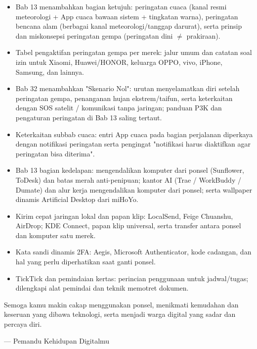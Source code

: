 \begin{itemize}
  \item Bab 13 menambahkan bagian ketujuh: peringatan cuaca (kanal resmi meteorologi + App cuaca bawaan sistem + tingkatan warna), peringatan bencana alam (berbagai kanal meteorologi/tanggap darurat), serta prinsip dan miskonsepsi peringatan gempa (peringatan dini $\neq$ prakiraan).
  \item Tabel pengaktifan peringatan gempa per merek: jalur umum dan catatan soal izin untuk Xiaomi, Huawei/HONOR, keluarga OPPO, vivo, iPhone, Samsung, dan lainnya.
  \item Bab 32 menambahkan "Skenario Nol": urutan menyelamatkan diri setelah peringatan gempa, penanganan hujan ekstrem/taifun, serta keterkaitan dengan SOS satelit / komunikasi tanpa jaringan; panduan P3K dan pengaturan peringatan di Bab 13 saling tertaut.
  \item Keterkaitan subbab cuaca: entri App cuaca pada bagian perjalanan diperkaya dengan notifikasi peringatan serta pengingat "notifikasi harus diaktifkan agar peringatan bisa diterima".
\end{itemize}


\begin{itemize}
  \item Bab 13 bagian kedelapan: mengendalikan komputer dari ponsel (Sunflower, ToDesk) dan batas merah anti-penipuan; kantor AI (Trae / WorkBuddy / Dumate) dan alur kerja mengendalikan komputer dari ponsel; serta wallpaper dinamis Artificial Desktop dari miHoYo.
  \item Kirim cepat jaringan lokal dan papan klip: LocalSend, Feige Chuanshu, AirDrop; KDE Connect, papan klip universal, serta transfer antara ponsel dan komputer satu merek.
  \item Kata sandi dinamis 2FA: Aegis, Microsoft Authenticator, kode cadangan, dan hal yang perlu diperhatikan saat ganti ponsel.
  \item TickTick dan pemindaian kertas: perincian penggunaan untuk jadwal/tugas; dilengkapi alat pemindai dan teknik memotret dokumen.
\end{itemize}

Semoga kamu makin cakap menggunakan ponsel, menikmati kemudahan dan keseruan yang dibawa teknologi, serta menjadi warga digital yang sadar dan percaya diri.

— Pemandu Kehidupan Digitalmu
